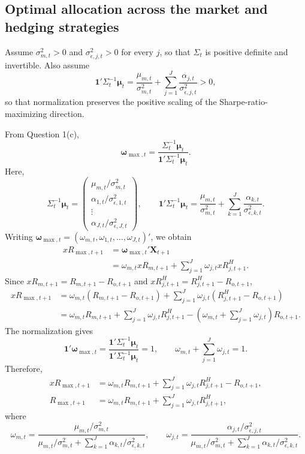 \documentclass[11pt]{article}
\begin{document}
\subsection*{Optimal allocation across the market and hedging strategies}

Assume $\sigma^2_{m,t}>0$ and $\sigma^2_{\epsilon,j,t}>0$ for every $j$,
so that $\Sigma_t$ is positive definite and invertible. Also assume
\[
\mathbf1'\Sigma_t^{-1}\boldsymbol\mu_t
=\frac{\mu_{m,t}}{\sigma^2_{m,t}}
+\sum_{j=1}^J\frac{\alpha_{j,t}}{\sigma^2_{\epsilon,j,t}}>0,
\]
so that normalization preserves the positive scaling of the
Sharpe-ratio-maximizing direction.

From Question 1(c),
\[
\boldsymbol\omega_{\max,t}
=\frac{\Sigma_t^{-1}\boldsymbol\mu_t}
{\mathbf1'\Sigma_t^{-1}\boldsymbol\mu_t}.
\]
Here,
\[
\Sigma_t^{-1}\boldsymbol\mu_t
=\begin{pmatrix}
\mu_{m,t}/\sigma^2_{m,t}\\
\alpha_{1,t}/\sigma^2_{\epsilon,1,t}\\
\vdots\\\alpha_{J,t}/\sigma^2_{\epsilon,J,t}
\end{pmatrix},\qquad
\mathbf1'\Sigma_t^{-1}\boldsymbol\mu_t
=\frac{\mu_{m,t}}{\sigma^2_{m,t}}
+\sum_{k=1}^J\frac{\alpha_{k,t}}{\sigma^2_{\epsilon,k,t}}.
\]
Writing $\boldsymbol\omega_{\max,t}
=(\omega_{m,t},\omega_{1,t},\ldots,\omega_{J,t})'$, we obtain
\begin{align*}
xR_{\max,t+1}
&=\boldsymbol\omega_{\max,t}'\mathbf X_{t+1}\\
&=\omega_{m,t}xR_{m,t+1}
+\sum_{j=1}^J\omega_{j,t}xR^H_{j,t+1}.
\end{align*}
Since $xR_{m,t+1}=R_{m,t+1}-R_{o,t+1}$ and
$xR^H_{j,t+1}=R^H_{j,t+1}-R_{o,t+1}$,
\begin{align*}
xR_{\max,t+1}
&=\omega_{m,t}(R_{m,t+1}-R_{o,t+1})
+\sum_{j=1}^J\omega_{j,t}(R^H_{j,t+1}-R_{o,t+1})\\
&=\omega_{m,t}R_{m,t+1}+\sum_{j=1}^J\omega_{j,t}R^H_{j,t+1}
-\left(\omega_{m,t}+\sum_{j=1}^J\omega_{j,t}\right)R_{o,t+1}.
\end{align*}
The normalization gives
\[
\mathbf1'\boldsymbol\omega_{\max,t}
=\frac{\mathbf1'\Sigma_t^{-1}\boldsymbol\mu_t}
{\mathbf1'\Sigma_t^{-1}\boldsymbol\mu_t}=1,
\qquad \omega_{m,t}+\sum_{j=1}^J\omega_{j,t}=1.
\]
Therefore,
\begin{align*}
xR_{\max,t+1}
&=\omega_{m,t}R_{m,t+1}+\sum_{j=1}^J\omega_{j,t}R^H_{j,t+1}-R_{o,t+1},\\
R_{\max,t+1}
&=\omega_{m,t}R_{m,t+1}+\sum_{j=1}^J\omega_{j,t}R^H_{j,t+1},
\end{align*}
where
\[
\boxed{\omega_{m,t}=
\frac{\mu_{m,t}/\sigma^2_{m,t}}
{\mu_{m,t}/\sigma^2_{m,t}+\sum_{k=1}^J\alpha_{k,t}/\sigma^2_{\epsilon,k,t}},
\qquad
\omega_{j,t}=
\frac{\alpha_{j,t}/\sigma^2_{\epsilon,j,t}}
{\mu_{m,t}/\sigma^2_{m,t}+\sum_{k=1}^J\alpha_{k,t}/\sigma^2_{\epsilon,k,t}}.}
\]
\clearpage
\end{document}
